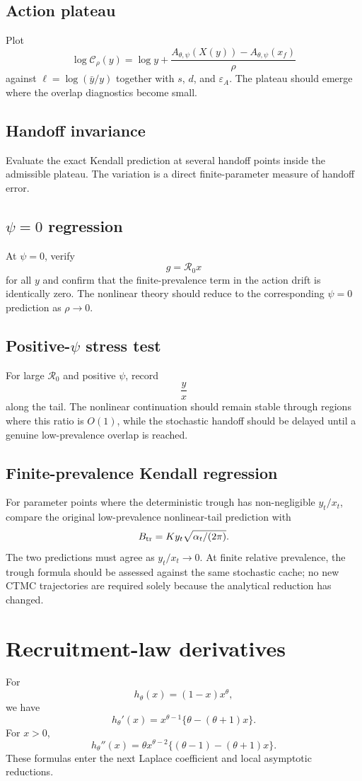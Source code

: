 \documentclass[11pt]{article}
\newcommand{\Rzero}{\mathcal R_0}
\newcommand{\hth}{h_\theta}
\newcommand{\Apsi}{A_{\theta,\psi}}
\newcommand{\xf}{x_f}
\newcommand{\CalC}{\mathcal C_\rho}
\newcommand{\epsA}{\varepsilon_A}
\begin{document}
\subsection{Action plateau}
Plot
\[
\log\CalC(y)
=\log y+\frac{\Apsi(X(y))-\Apsi(\xf)}\rho
\]
against $\ell=\log(\bar y/y)$ together with $s$, $d$, and $\epsA$. The plateau should emerge where the overlap diagnostics become small.

\subsection{Handoff invariance}
Evaluate the exact Kendall prediction at several handoff points inside the admissible plateau. The variation is a direct finite-parameter measure of handoff error.

\subsection{\texorpdfstring{$\psi=0$}{psi=0} regression}
At $\psi=0$, verify
\[
g=\Rzero x
\]
for all $y$ and confirm that the finite-prevalence term in the action drift is identically zero. The nonlinear theory should reduce to the corresponding $\psi=0$ prediction as $\rho\to0$.

\subsection{Positive-\texorpdfstring{$\psi$}{psi} stress test}
For large $\Rzero$ and positive $\psi$, record
\[
\frac yx
\]
along the tail. The nonlinear continuation should remain stable through regions where this ratio is $O(1)$, while the stochastic handoff should be delayed until a genuine low-prevalence overlap is reached.

\subsection{Finite-prevalence Kendall regression}
For parameter points where the deterministic trough has non-negligible $y_t/x_t$, compare the original low-prevalence nonlinear-tail prediction with
\[
B_{\rm tr}=K y_t\sqrt{\alpha_t/(2\pi)}.
\]
The two predictions must agree as $y_t/x_t\to0$.  At finite relative prevalence, the trough formula should be assessed against the same stochastic cache; no new CTMC trajectories are required solely because the analytical reduction has changed.

\section{Recruitment-law derivatives}
For
\[
\hth(x)=(1-x)x^\theta,
\]
we have
\[
\boxed{
\hth'(x)=x^{\theta-1}\{\theta-(\theta+1)x\}.
}
\]
For $x>0$,
\[
\boxed{
\hth''(x)
=\theta x^{\theta-2}\{(\theta-1)-(\theta+1)x\}.
}
\]
These formulas enter the next Laplace coefficient and local asymptotic reductions.
\end{document}

